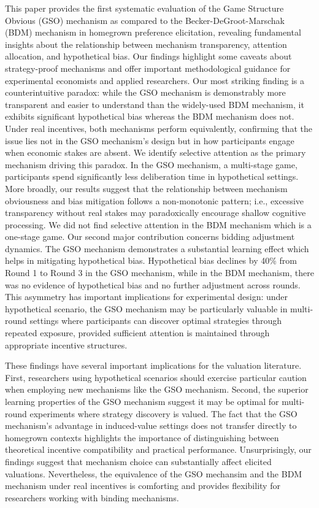 \documentclass[12pt]{article}
\begin{document}
This paper provides the first systematic evaluation of the Game Structure Obvious (GSO) mechanism as compared to the Becker-DeGroot-Marschak (BDM) mechanism in homegrown preference elicitation, revealing fundamental insights about the relationship between mechanism transparency, attention allocation, and hypothetical bias. Our findings highlight some caveats about strategy-proof mechanisms and offer important methodological guidance for experimental economists and applied researchers.
Our most striking finding is a counterintuitive paradox: while the GSO mechanism is demonstrably more transparent and easier to understand than the widely-used BDM mechanism, it exhibits significant hypothetical bias whereas the BDM mechanism does not. Under real incentives, both mechanisms perform equivalently, confirming that the issue lies not in the GSO mechanism's design but in how participants engage when economic stakes are absent.
We identify selective attention as the primary mechanism driving this paradox. In the GSO mechanism, a multi-stage game, participants spend significantly less deliberation time in hypothetical settings. More broadly, our results suggest that the relationship between mechanism obviousness and bias mitigation follows a non-monotonic pattern; i.e., excessive transparency without real stakes may paradoxically encourage shallow cognitive processing. We did not find selective attention in the BDM mechanism which is a one-stage game.
Our second major contribution concerns bidding adjustment dynamics. The GSO mechanism demonstrates a substantial learning effect which helps in mitigating hypothetical bias. Hypothetical bias declines by 40\% from Round 1 to Round 3 in the GSO mechanism, while in the BDM mechanism, there was no evidence of hypothetical bias and no further adjustment across rounds. This asymmetry has important implications for experimental design: under hypothetical scenario, the GSO mechanism may be particularly valuable in multi-round settings where participants can discover optimal strategies through repeated exposure, provided sufficient attention is maintained through appropriate incentive structures. 

These findings have several important implications for the valuation literature. First, researchers using hypothetical scenarios should exercise particular caution when employing new mechanisms like the GSO mechanism. Second, the superior learning properties of the GSO mechanism suggest it may be optimal for multi-round experiments where strategy discovery is valued. The fact that the GSO mechanism's advantage in induced-value settings does not transfer directly to  homegrown contexts highlights the importance of distinguishing between theoretical incentive compatibility and practical performance. 
Unsurprisingly, our findings suggest that mechanism choice can substantially affect elicited valuations. Nevertheless, the equivalence of the GSO mechansim and the BDM mechanism under real incentives is comforting and provides flexibility for researchers working with binding mechanisms.
\end{document}
